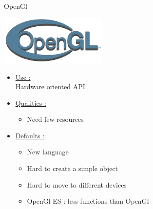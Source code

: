 \documentclass[a4paper,10pt]{beamer}
\begin{document}
			\begin{frame}{OpenGl}
				\begin{multicols}{2}
					\includegraphics[height=70pt]{images/logos/OpenGL_logo.png}\\
					
					\columnbreak 
					
					\begin{itemize}
						\item \underline{Use :}\\		
						Hardware oriented API			
						\item \underline{Qualities :}\\
						\begin{itemize}
							\item Need few resources
						\end{itemize}
					\end{itemize}		 
				\end{multicols}
				\begin{itemize}
					\item \underline{Defaults :}\\
					\begin{itemize}
						\item New language
						\item Hard to create a simple object
						\item Hard to move to different devices
						\item OpenGl ES : less functions than OpenGl
					\end{itemize}
				\end{itemize}
			\end{frame}
			
\end{document}
